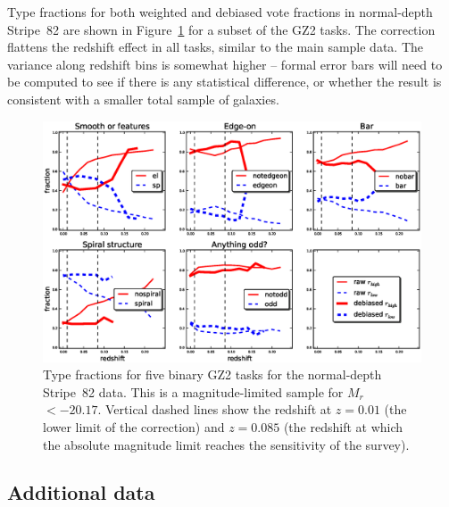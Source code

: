 \documentclass[useAMS,usenatbib]{mn2e}
\newcommand{\mr}{$M_r$}
\begin{document}
%
%
%
%

Type fractions for both weighted and debiased vote fractions in normal-depth Stripe~82 are shown in Figure~\ref{fig-type_fractions_s82} for a subset of the GZ2 tasks. The correction flattens the redshift effect in all tasks, similar to the main sample data. The variance along redshift bins is somewhat higher -- formal error bars will need to be computed to see if there is any statistical difference, or whether the result is consistent with a smaller total sample of galaxies.  

\begin{figure}
\includegraphics[angle=0,width=7.0in]{figures/gz2_stripe82_type_fractions.eps}
\caption{Type fractions for five binary GZ2 tasks for the normal-depth Stripe~82 data. This is a magnitude-limited sample for \mr~$<-20.17$. Vertical dashed lines show the redshift at $z=0.01$ (the lower limit of the correction) and $z=0.085$ (the redshift at which the absolute magnitude limit reaches the sensitivity of the survey). 
\label{fig-type_fractions_s82}}
\end{figure}

\subsection{Additional data}\label{ssec-metadata}
\end{document}
